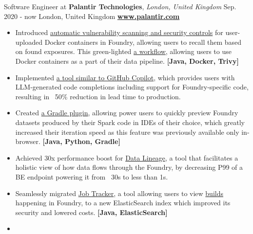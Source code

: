\cveventflat
{Software Engineer at }
{\textbf{Palantir Technologies}, \textit{London, United Kingdom}}
{Sep. 2020 - now}
{London, United Kingdom}
\newline
\href{https://www.palantir.com/}{\textbf{www.palantir.com}}
\begin{itemize}
    \item {
        Introduced
        \href{https://www.palantir.com/docs/foundry/administration/container-governance/}{automatic vulnerability scanning and security controls}
        for user-uploaded Docker containers in Foundry, allowing users to recall them based on found exposures.
        This green-lighted
        \href{https://www.palantir.com/docs/foundry/transforms-python/container-overview/}{a workflow},
        allowing users to use Docker containers as a part of their data pipeline.
    }
    \textbf{[Java, Docker, Trivy]}
    \item {
        Implemented
        \href{https://www.palantir.com/docs/foundry/code-repositories/aip-features/#code-autocomplete}{a tool similar to GitHub Copilot},
        which provides users with LLM-generated code completions including support for Foundry-specific code,
        resulting in ~50\% reduction in lead time to production.
    }
    \item {
        Created
        \href{https://www.palantir.com/docs/foundry/transforms-common/local-preview/}{a Gradle plugin},
        allowing power users to quickly preview Foundry datasets produced by their Spark code in IDEs of their
        choice, which greatly increased their iteration speed as this feature was previously available only in-browser.
    }
    \textbf{[Java, Python, Gradle]}
    \item {
        Achieved 30x performance boost for
        \href{https://www.palantir.com/docs/foundry/data-lineage/overview/}{Data Lineage},
        a tool that facilitates a holistic view of how data flows through the Foundry,
        by decreasing P99 of a BE endpoint powering it from ~30s to less than 1s.
    }
    \item {
        Seamlessly migrated
        \href{https://www.palantir.com/docs/foundry/data-integration/application-reference/#builds}{Job Tracker},
        a tool allowing users to view
        \href{https://www.palantir.com/docs/foundry/data-integration/builds/}{builds}
        happening in Foundry, to a new ElasticSearch index which improved its security and lowered costs.
    }
    \textbf{[Java, ElasticSearch]}
    \item {
}
\end{itemize}

